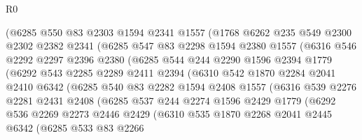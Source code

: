 \begin{lexlean}{R0}
\begin{coremodule}
            (@6285
              @550
              @83
              @2303
              @1594
              @2341
              @1557
              (@1768
                @6262
                @235
                @549
                @2300
                @2302
                @2382
                @2341
                (@6285
                  @547
                  @83
                  @2298
                  @1594
                  @2380
                  @1557
                  (@6316
                    @546
                    @2292
                    @2297
                    @2396
                    @2380
                    (@6285
                      @544
                      @244
                      @2290
                      @1596
                      @2394
                      @1779
                      (@6292
                        @543
                        @2285
                        @2289
                        @2411
                        @2394
                        (@6310
                          @542
                          @1870
                          @2284
                          @2041
                          @2410
                          @6342
                          (@6285
                            @540
                            @83
                            @2282
                            @1594
                            @2408
                            @1557
                            (@6316
                              @539
                              @2276
                              @2281
                              @2431
                              @2408
                              (@6285
                                @537
                                @244
                                @2274
                                @1596
                                @2429
                                @1779
                                (@6292
                                  @536
                                  @2269
                                  @2273
                                  @2446
                                  @2429
                                  (@6310
                                    @535
                                    @1870
                                    @2268
                                    @2041
                                    @2445
                                    @6342
                                    (@6285
                                      @533
                                      @83
                                      @2266

\end{coremodule}
\end{lexlean}
